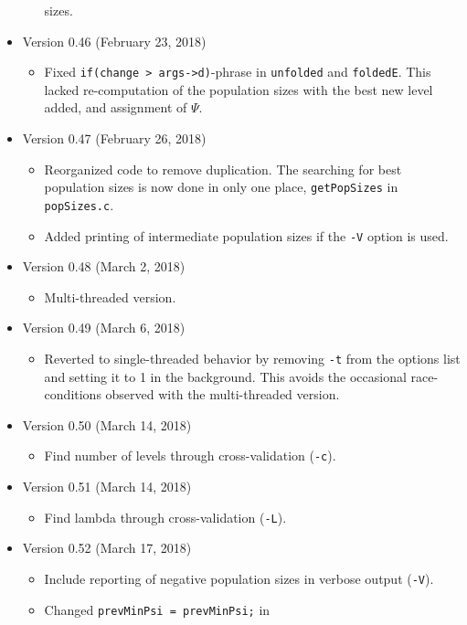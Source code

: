 \documentclass[a4paper]{article}
\newcommand{\ty}{\texttt}
\begin{document}
\begin{itemize}
\begin{itemize}
    sizes.
  \end{itemize}
\item Version 0.46 (February 23, 2018)
  \begin{itemize}
    \item Fixed \ty{if(change > args->d)}-phrase in \ty{unfolded} and
      \ty{foldedE}. This lacked re-computation of the population sizes
      with the best new level added, and assignment of $\Psi$.
  \end{itemize}
\item Version 0.47 (February 26, 2018)
  \begin{itemize}
    \item Reorganized code to remove duplication. The searching for
      best population sizes is now done in only one place,
      \ty{getPopSizes} in \ty{popSizes.c}.
    \item Added printing of intermediate population sizes if the
      \ty{-V} option is used.
  \end{itemize}
\item Version 0.48 (March 2, 2018)
  \begin{itemize}
  \item Multi-threaded version.
  \end{itemize}
\item Version 0.49 (March 6, 2018)
  \begin{itemize}
  \item Reverted to single-threaded behavior by removing \ty{-t} from
    the options list and setting it to 1 in the background. This avoids the occasional
    race-conditions observed with the multi-threaded version.
  \end{itemize}
\item Version 0.50 (March 14, 2018)
  \begin{itemize}
  \item Find number of levels through cross-validation (\ty{-c}).
  \end{itemize}
\item Version 0.51 (March 14, 2018)
  \begin{itemize}
  \item Find lambda through cross-validation (\ty{-L}).
  \end{itemize}
\item Version 0.52 (March 17, 2018)
  \begin{itemize}
    \item Include reporting of negative population sizes in verbose
      output (\ty{-V}).
    \item Changed     \ty{prevMinPsi = prevMinPsi;} in

\end{itemize}
\end{itemize}
\end{document}
